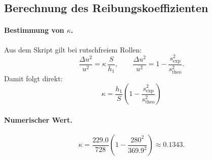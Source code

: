 \documentclass{article}
\begin{document}
\subsection{Berechnung des Reibungskoeffizienten}

\paragraph{Bestimmung von \texorpdfstring{$\kappa$}{kappa}.}
Aus dem Skript gilt bei rutschfreiem Rollen:
\begin{equation}
\frac{\Delta u^2}{u^2}=\kappa\,\frac{S}{h_1},
\qquad
\frac{\Delta u^2}{u^2}=1-\frac{s_\mathrm{exp}^2}{s_\mathrm{theo}^2}.
\end{equation}
Damit folgt direkt:
\begin{equation}
{\;
\kappa=\frac{h_1}{S}\left(1-\frac{s_\mathrm{exp}^2}{s_\mathrm{theo}^2}\right)
\;}
\end{equation}

\paragraph{Numerischer Wert.}
\begin{equation}
\kappa
=\frac{229.0}{728}\left(1-\frac{280^2}{369.9^2}\right)
\approx 0.1343.
\end{equation}
\end{document}

